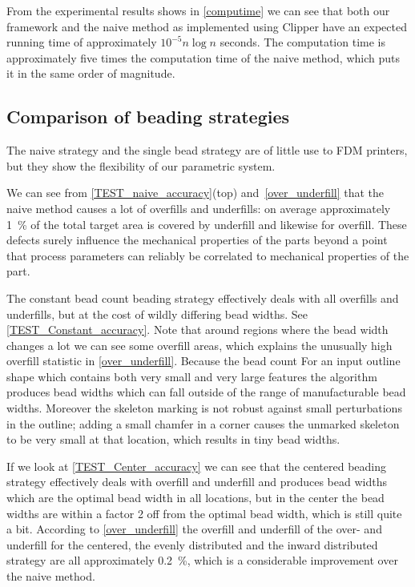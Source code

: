 From the experimental results shows in \cref{computime} we can see that both our framework and the naive method as implemented using Clipper have an expected running time of approximately $10^{-5} n \log n$ seconds.
The computation time is approximately five times the computation time of the naive method, which puts it in the same order of magnitude.




\subsection{Comparison of beading strategies}
The naive strategy and the single bead strategy are of little use to FDM printers, but they show the flexibility of our parametric system.

We can see from \cref{TEST_naive_accuracy}(top) and~\ref{over_underfill} that the naive method causes a lot of overfills and underfills: on average approximately \SI{1}{\percent} of the total target area is covered by underfill and likewise for overfill.
These defects surely influence the mechanical properties of the parts beyond a point that process parameters can reliably be correlated to mechanical properties of the part.


The constant bead count beading strategy effectively deals with all overfills and underfills, but at the cost of wildly differing bead widths.
See \cref{TEST_Constant_accuracy}.
Note that around regions where the bead width changes a lot we can see some overfill areas, which explains the unusually high overfill statistic in \cref{over_underfill}.
Because the bead count 
For an input outline shape which contains both very small and very large features the algorithm produces bead widths which can fall outside of the range of manufacturable bead widths.
Moreover the skeleton marking is not robust against small perturbations in the outline; adding a small chamfer in a corner causes the unmarked skeleton to be very small at that location, which results in tiny bead widths.

If we look at \cref{TEST_Center_accuracy} we can see that
the centered beading strategy effectively deals with overfill and underfill and produces bead widths which are the optimal bead width in all locations, but in the center the bead widths are within a factor 2 off from the optimal bead width, which is still quite a bit.
According to \cref{over_underfill} the overfill and underfill of the over- and underfill for the centered, the evenly distributed and the inward distributed strategy are all approximately \SI{0.2}{\percent}, which is a considerable improvement over the naive method.

